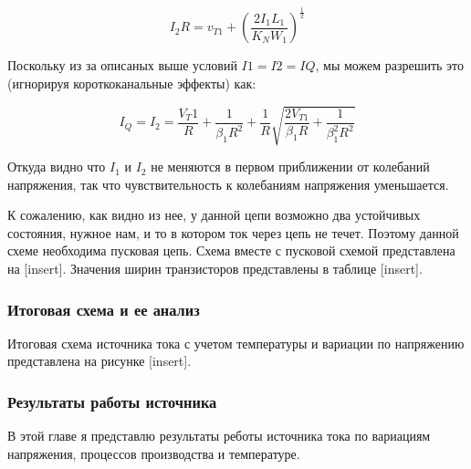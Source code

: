 \documentclass[a4paper,12pt]{article} %
\begin{document}
 $$ I_2 R = v_{T1} + ( \frac{2I_1 L_1}{ K_N W_1})^{\frac{1}{2}} $$

 Поскольку из за описаных выше условий $ I1=I2=IQ $, мы можем разрешить это (игнорируя короткоканальные эффекты) как:

\begin{equation}
    I_Q = I_2 =  \frac{V_T1}{R} + \frac{1}{\beta_1 R^2} + \frac{1}{R} \sqrt{ \frac{2 V_{T1}}{\beta_1 R} + \frac{1}{\beta_1^2 R^2}}
\end{equation}

Откуда видно что $I_1$ и $I_2$ не меняются в первом приближении от колебаний напряжения, так что чувствительность к колебаниям напряжения уменьшается. 


К сожалению, как видно из нее, у данной цепи возможно два устойчивых состояния, нужное нам, и то в котором ток через цепь не течет. Поэтому данной схеме необходима пусковая цепь\cite{op_amp_comp13}. Схема вместе с пусковой схемой представлена на  [insert]. Значения ширин транзисторов представлены в таблице [insert]. 

\subsubsection{Итоговая схема и ее анализ}

Итоговая схема источника тока с учетом температуры и вариации по напряжению представлена на рисунке [insert]. 





\subsubsection{Результаты работы источника}


В этой главе я представлю результаты реботы источника тока по вариациям напряжения, процессов производства и температуре.
\end{document}
